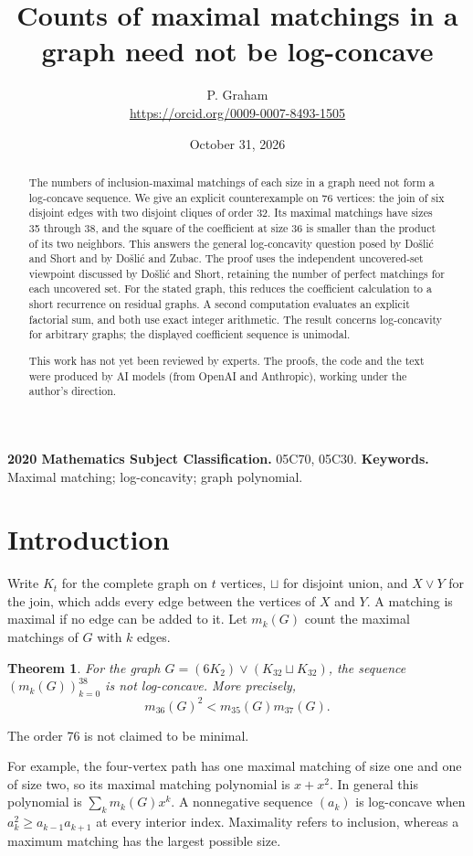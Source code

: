 \documentclass[11pt]{article}
\title{Counts of maximal matchings in a graph need not be log-concave}
\author{P. Graham\\ \small\url{https://orcid.org/0009-0007-8493-1505}}
\date{October 31, 2026}
\newtheorem{theorem}{Theorem}
\begin{document}
\maketitle
\begin{abstract}
The numbers of inclusion-maximal matchings of each size in a graph need
not form a log-concave sequence. We give an explicit counterexample on
76 vertices: the join of six disjoint edges with two disjoint cliques of
order 32. Its maximal matchings have sizes 35 through 38, and the square
of the coefficient at size 36 is smaller than the product of its two
neighbors. This answers the general log-concavity question posed by
Do\v{s}li\'c and Short and by Do\v{s}li\'c and Zubac. The proof uses the
independent uncovered-set viewpoint discussed by Do\v{s}li\'c and Short,
retaining the number of perfect matchings for each uncovered set.
For the stated graph, this reduces the coefficient calculation to a
short recurrence on residual graphs. A second computation evaluates an
explicit factorial sum, and both use exact integer arithmetic. The
result concerns log-concavity for arbitrary graphs; the displayed
coefficient sequence is unimodal.

This work has not yet been reviewed by experts.
The proofs, the code and the text were produced by AI models (from OpenAI and Anthropic), working under the author's direction.
\end{abstract}
\medskip
\noindent\textbf{2020 Mathematics Subject Classification.} 05C70, 05C30.
\quad\textbf{Keywords.} Maximal matching; log-concavity; graph polynomial.

\section{Introduction}
Write $K_t$ for the complete graph on $t$ vertices, $\sqcup$ for disjoint
union, and $X\vee Y$ for the join, which adds every edge between the
vertices of $X$ and $Y$. A matching is maximal if no edge can be added
to it. Let $m_k(G)$ count the maximal matchings of $G$ with $k$ edges.

\begin{theorem}\label{thm:main}
For the graph $G=(6K_2)\vee(K_{32}\sqcup K_{32})$, the sequence
$(m_k(G))_{k=0}^{38}$ is not log-concave. More precisely,
\[
 m_{36}(G)^2<m_{35}(G)m_{37}(G).
\]
\end{theorem}
The order 76 is not claimed to be minimal.

For example, the four-vertex path has one maximal matching of size one
and one of size two, so its maximal matching polynomial is $x+x^2$.
In general this polynomial is $\sum_k m_k(G)x^k$. A nonnegative
sequence $(a_k)$ is log-concave when $a_k^2\geq a_{k-1}a_{k+1}$ at
every interior index. Maximality refers to inclusion, whereas a maximum
matching has the largest possible size.
\end{document}
